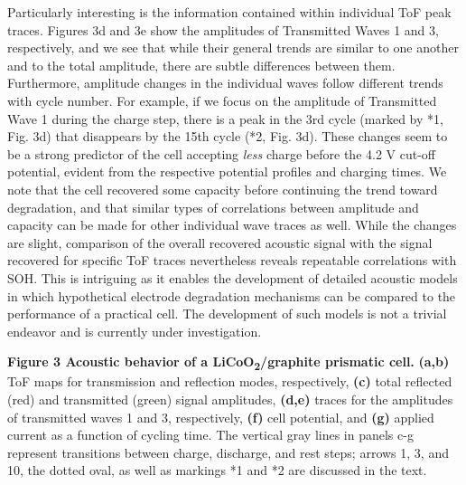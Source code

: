 \documentclass[]{article}
\begin{document}
{ }Particularly interesting is the information contained within
individual ToF peak traces. Figures 3d and 3e show the amplitudes of
Transmitted Waves 1 and 3, respectively, and we see that while their
general trends are similar to one another and to the total amplitude,
there are subtle differences between them. Furthermore, amplitude
changes in the individual waves follow different trends with cycle
number. For example, if we focus on the amplitude of Transmitted Wave 1
during the charge step, there is a peak in the 3rd cycle (marked by *1,
Fig. 3d) that disappears by the 15th cycle (*2, Fig. 3d). These changes
seem to be a strong predictor of the cell accepting \emph{less} charge
before the 4.2 V cut-off potential, evident from the respective
potential profiles and charging times. We note that the cell recovered
some capacity before continuing the trend toward degradation, and that
similar types of correlations between amplitude and capacity can be made
for other individual wave traces as well. While the changes are slight,
comparison of the overall recovered acoustic signal with the signal
recovered for specific ToF traces nevertheless reveals repeatable
correlations with SOH. This is intriguing as it enables the development
of detailed acoustic models in which hypothetical electrode degradation
mechanisms can be compared to the performance of a practical cell. The
development of such models is not a trivial endeavor and is currently
under investigation.

\textbf{Figure 3 \textbar{} Acoustic behavior of a
LiCoO\textsubscript{2}/graphite prismatic cell.} \textbf{(a,b)} ToF maps
for transmission and reflection modes, respectively, \textbf{(c)} total
reflected (red) and transmitted (green) signal amplitudes,
\textbf{(d,e)} traces for the amplitudes of transmitted waves 1 and 3,
respectively, \textbf{(f)} cell potential, and \textbf{(g)} applied
current as a function of cycling time. The vertical gray lines in panels
c-g represent transitions between charge, discharge, and rest steps;
arrows 1, 3, and 10, the dotted oval, as well as markings *1 and *2 are
discussed in the text.
\end{document}
